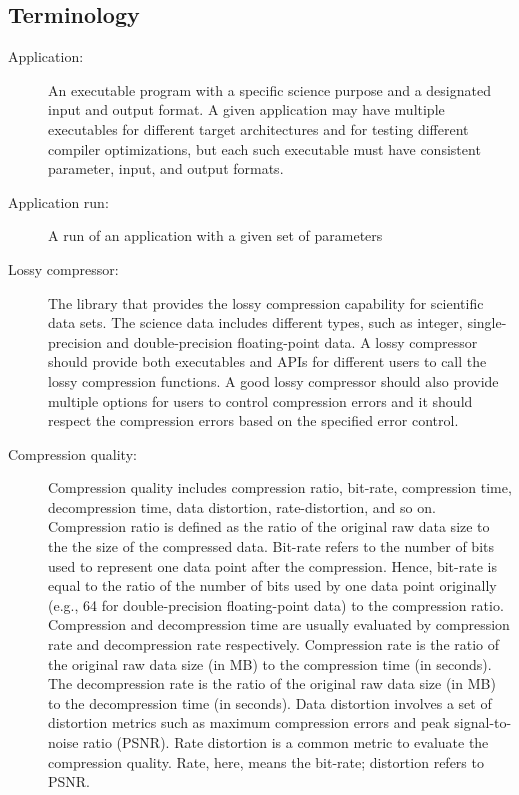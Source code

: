 \subsection{Terminology}

\begin{description}

\item[Application:] An executable program with a specific science purpose and a
designated input and output format. A given application may have multiple
executables for different target architectures and for testing different
compiler optimizations, but each such executable must have consistent
parameter, input, and output formats.

\item[Application run:] A run of an application with a given set of parameters

\item[Lossy compressor:] The library that provides the lossy compression capability for scientific data sets. The science data includes different types, such as integer, single-precision and double-precision floating-point data. A lossy compressor should provide both executables and APIs for different users to call the lossy compression functions. A good lossy compressor should also provide multiple options for users to control compression errors and it should respect the compression errors based on the specified error control.

\item[Compression quality:] Compression quality includes compression ratio, bit-rate, compression time, decompression time, data distortion, rate-distortion, and so on. Compression ratio is defined as the ratio of the original raw data size to the the size of the compressed data. Bit-rate refers to the number of bits used to represent one data point after the compression. Hence, bit-rate is equal to the ratio of the number of bits used by one data point originally (e.g., 64 for double-precision floating-point data) to the compression ratio. Compression and decompression time are usually evaluated by compression rate and decompression rate respectively. Compression rate is the ratio of the original raw data size (in MB) to the compression time (in seconds). The decompression rate is the ratio of the original raw data size (in MB) to the decompression time (in seconds). Data distortion involves a set of distortion metrics such as maximum compression errors and peak signal-to-noise ratio (PSNR). Rate distortion is a common metric to evaluate the compression quality. Rate, here, means the bit-rate; distortion refers to PSNR.



\end{description}
